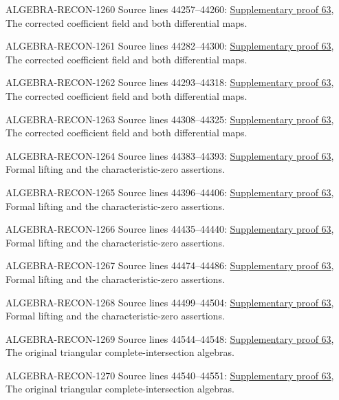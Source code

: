 \begin{AlgebraSourceRoutes}
\item[ALGEBRA-RECON-1260] Source lines 44257--44260: \hyperlink{algebra_field_formal_smooth_notes_20260929}{Supplementary proof 63}, The corrected coefficient field and both differential maps.
\item[ALGEBRA-RECON-1261] Source lines 44282--44300: \hyperlink{algebra_field_formal_smooth_notes_20260929}{Supplementary proof 63}, The corrected coefficient field and both differential maps.
\item[ALGEBRA-RECON-1262] Source lines 44293--44318: \hyperlink{algebra_field_formal_smooth_notes_20260929}{Supplementary proof 63}, The corrected coefficient field and both differential maps.
\item[ALGEBRA-RECON-1263] Source lines 44308--44325: \hyperlink{algebra_field_formal_smooth_notes_20260929}{Supplementary proof 63}, The corrected coefficient field and both differential maps.
\item[ALGEBRA-RECON-1264] Source lines 44383--44393: \hyperlink{algebra_field_formal_smooth_notes_20260929}{Supplementary proof 63}, Formal lifting and the characteristic-zero assertions.
\item[ALGEBRA-RECON-1265] Source lines 44396--44406: \hyperlink{algebra_field_formal_smooth_notes_20260929}{Supplementary proof 63}, Formal lifting and the characteristic-zero assertions.
\item[ALGEBRA-RECON-1266] Source lines 44435--44440: \hyperlink{algebra_field_formal_smooth_notes_20260929}{Supplementary proof 63}, Formal lifting and the characteristic-zero assertions.
\item[ALGEBRA-RECON-1267] Source lines 44474--44486: \hyperlink{algebra_field_formal_smooth_notes_20260929}{Supplementary proof 63}, Formal lifting and the characteristic-zero assertions.
\item[ALGEBRA-RECON-1268] Source lines 44499--44504: \hyperlink{algebra_field_formal_smooth_notes_20260929}{Supplementary proof 63}, Formal lifting and the characteristic-zero assertions.
\item[ALGEBRA-RECON-1269] Source lines 44544--44548: \hyperlink{algebra_field_formal_smooth_notes_20260929}{Supplementary proof 63}, The original triangular complete-intersection algebras.
\item[ALGEBRA-RECON-1270] Source lines 44540--44551: \hyperlink{algebra_field_formal_smooth_notes_20260929}{Supplementary proof 63}, The original triangular complete-intersection algebras.
\end{AlgebraSourceRoutes}

